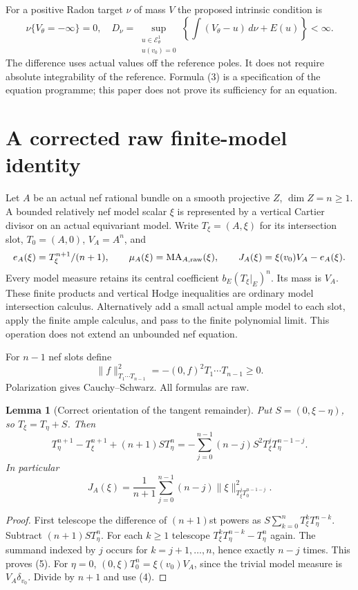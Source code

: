 \documentclass[10pt]{article}
\newtheorem{lemma}[theorem]{Lemma}
\newcommand{\MA}{\operatorname{MA}}
\newcommand{\E}{\mathcal E}
\begin{document}
For a positive Radon target $\nu$ of mass $V$ the proposed intrinsic
condition is
\[
 \nu\{V_\theta=-\infty\}=0,\quad
 D_\nu=\sup_{\substack{u\in\E^1_\theta\\u(v_0)=0}}
 \left\{\int(V_\theta-u)\,d\nu+E(u)\right\}<\infty.             \tag{3}
\]
The difference uses actual values off the reference poles.
It does not require absolute integrability of the reference.
Formula (3) is a specification of the equation programme; this paper
does not prove its sufficiency for an equation.

\section{A corrected raw finite-model identity}
Let $A$ be an actual nef rational bundle on a smooth projective $Z$,
$\dim Z=n\geq1$. A bounded relatively nef model scalar $\xi$
is represented by a vertical Cartier divisor on an actual equivariant
model. Write $T_\xi=(A,\xi)$ for its intersection slot, $T_0=(A,0)$,
$V_A=A^n$, and
\[
 e_A(\xi)=T_\xi^{n+1}/(n+1),\qquad
 \mu_A(\xi)=\MA_{A,\rm raw}(\xi),\qquad
 J_A(\xi)=\xi(v_0)V_A-e_A(\xi).
\]
Every model measure retains its central coefficient
$b_E(T_\xi|_E)^n$. Its mass is $V_A$.
These finite products and vertical Hodge inequalities are ordinary
model intersection calculus. Alternatively add a small actual ample
model to each slot, apply the finite ample calculus, and pass to the
finite polynomial limit. This operation does not extend an unbounded
nef equation.

For $n-1$ nef slots define
\[
 \|f\|_{T_1\cdots T_{n-1}}^2=-(0,f)^2T_1\cdots T_{n-1}\geq0.
                                                               \tag{4}
\]
Polarization gives Cauchy--Schwarz. All formulas are raw.

\begin{lemma}[Correct orientation of the tangent remainder]\label{identity}
Put $S=(0,\xi-\eta)$, so $T_\xi=T_\eta+S$. Then
\[
 T_\eta^{n+1}-T_\xi^{n+1}
       +(n+1)S T_\eta^n
 =-\sum_{j=0}^{n-1}(n-j)S^2T_\xi^jT_\eta^{n-1-j}.             \tag{5}
\]
In particular
\[
 J_A(\xi)=\frac1{n+1}\sum_{j=0}^{n-1}(n-j)
                  \|\xi\|_{T_\xi^jT_0^{n-1-j}}^2.             \tag{6}
\]
\end{lemma}
\begin{proof}
First telescope the difference of $(n+1)$st powers as
$S\sum_{k=0}^nT_\xi^kT_\eta^{n-k}$. Subtract
$(n+1)ST_\eta^n$. For each $k\geq1$ telescope
$T_\xi^kT_\eta^{n-k}-T_\eta^n$ again. The summand indexed by
$j$ occurs for $k=j+1,\ldots,n$, hence exactly $n-j$ times.
This proves (5). For $\eta=0$,
$(0,\xi)T_0^n=\xi(v_0)V_A$, since the trivial model measure is
$V_A\delta_{v_0}$. Divide by $n+1$ and use (4).
\end{proof}
\end{document}
